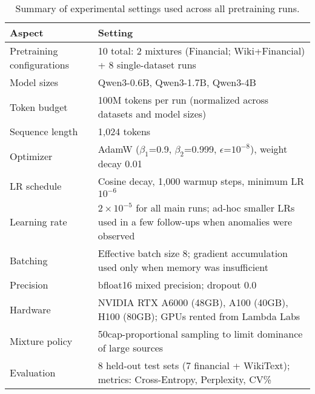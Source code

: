 \begin{table}[h]
\centering
\caption[Experimental Settings Summary]{Summary of experimental settings used across all pretraining runs.}
\label{tab:exp_settings}
\small
\begin{tabular}{p{3.8cm} p{9.5cm}}
\toprule
\textbf{Aspect} & \textbf{Setting} \\
\midrule
Pretraining configurations & 10 total: 2 mixtures (Financial; Wiki+Financial) + 8 single-dataset runs \\
Model sizes & Qwen3-0.6B, Qwen3-1.7B, Qwen3-4B \\
Token budget & 100M tokens per run (normalized across datasets and model sizes) \\
Sequence length & 1{,}024 tokens \\
Optimizer & AdamW ($\beta_1$=0.9, $\beta_2$=0.999, $\epsilon$=$10^{-8}$), weight decay 0.01 \\
LR schedule & Cosine decay, 1{,}000 warmup steps, minimum LR $10^{-6}$ \\
Learning rate & $2\times10^{-5}$ for all main runs; ad-hoc smaller LRs used in a few follow-ups when anomalies were observed \\
Batching & Effective batch size 8; gradient accumulation used only when memory was insufficient \\
Precision & bfloat16 mixed precision; dropout 0.0 \\
Hardware & NVIDIA RTX A6000 (48GB), A100 (40GB), H100 (80GB); GPUs rented from Lambda Labs \\
Mixture policy & 50cap-proportional sampling to limit dominance of large sources \\
Evaluation & 8 held-out test sets (7 financial + WikiText); metrics: Cross-Entropy, Perplexity, CV\% \\
\bottomrule
\end{tabular}
\end{table}
